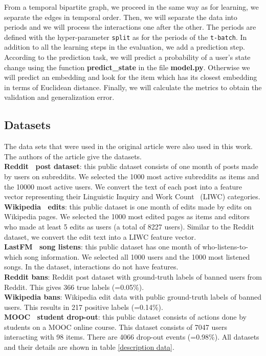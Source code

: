 From a temporal bipartite graph, we proceed in the same way as for learning, we separate the edges in temporal order. Then, we will separate the data into periods and we will process the interactions one after the other. The periods are defined with the hyper-parameter \texttt{split} as for the periods of the \texttt{t-batch}. In addition to all the learning steps in the evaluation, we add a prediction step. According to the prediction task, we will predict a probability of a user's state change using the function \textbf{predict\_state} in the file \textbf{model.py}. Otherwise we will predict an embedding and look for the item which has its closest embedding in terms of Euclidean distance. Finally, we will calculate the metrics to obtain the validation and generalization error.

\subsection*{Datasets}
 
The data sets that were used in the original article were also used in this work. The authors of the article give the datasets. \\

\textbf{Reddit~\cite{Reddit} post dataset}: this public dataset consists of one month of posts made by users on subreddits. We selected the 1000 most active subreddits as items and the 10000 most active users. We convert the text of each post into a feature vector representing their Linguistic Inquiry and Work Count~\cite{pennebaker01LIWC} (LIWC) categories.\\
\textbf{Wikipedia~\cite{Wiki} edits}: this public dataset is one month of edits made by edits on Wikipedia pages. We selected the 1000 most edited pages as items and editors who made at least 5 edits as users (a total of 8227 users). Similar to the Reddit dataset, we convert the edit text into a LIWC feature vector.\\
\textbf{LastFM~\cite{10.1007/978-3-642-33486-3_5lastFM} song listens}: this public dataset has one month of who-listens-to-which song information. We selected all 1000 users and the 1000 most listened songs. In the dataset, interactions do not have features.\\
\textbf{Reddit bans}: Reddit post dataset with ground-truth labels of banned users from Reddit. This gives 366 true labels (=0.05\%).\\
\textbf{Wikipedia bans}: Wikipedia edit data with public ground-truth labels of banned users. This results in 217 positive labels (=0.14\%).\\
\textbf{MOOC~\cite{mooc} student drop-out}: this public dataset consists of actions done by students on a MOOC online course. This dataset consists of 7047 users interacting with 98 items. There are 4066 drop-out events (=0.98\%). All datasets and their details are shown in table \ref{description data}. \\

